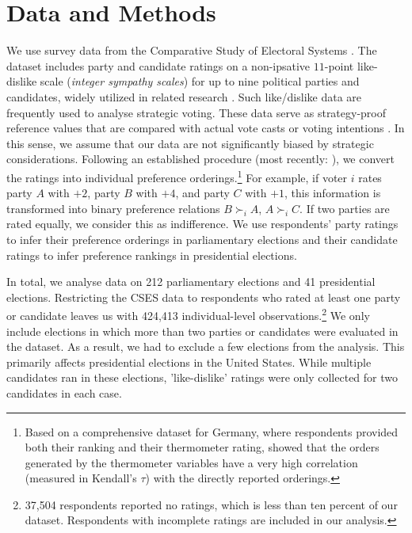 \documentclass[12pt]{scrartcl}
\newcommand{\nbparliament}{212 }
\newcommand{\nbpresidential}{41 }
\begin{document}
\section{Data and Methods}\label{sec.datamethods}  
We use survey data from the Comparative Study of Electoral Systems \citep{CSES2020}. The dataset includes party and candidate ratings on a non-ipsative $11$-point like-dislike scale (\emph{integer sympathy scales}) for up to nine political parties and candidates, widely utilized in related research \citep[e.g.,][]{Kalandrakis2022, Desai2025}. Such like/dislike data are frequently used to analyse strategic voting. These data serve as strategy-proof reference values that are compared with actual vote casts or voting intentions \citep{Abramson2009, Eggers2024, Nunez2024}. In this sense, we assume that our data are not significantly biased by strategic considerations. Following an established procedure (most recently: \cite{Lachat2024}), we convert the ratings into individual preference orderings.\footnote{
    Based on a comprehensive dataset for Germany, where respondents provided both their ranking and their thermometer rating, \cite{Barbaro2022} showed that the orders generated by the thermometer variables have a very high correlation (measured in Kendall's $\tau$) with the directly reported orderings.
} For example, if voter $i$ rates party $A$ with $+2$, party $B$ with $+4$, and party $C$ with $+1$, this information is transformed into binary preference relations $B \succ_i A$, $A \succ_i C$. If two parties are rated equally, we consider this as indifference. We use respondents' party ratings to infer their preference orderings in parliamentary elections and their candidate ratings to infer preference rankings in presidential elections.

In total, we analyse data on \nbparliament parliamentary elections and \nbpresidential presidential elections. Restricting the CSES data to respondents who rated at least one party or candidate leaves us with 424,413 individual-level observations.\footnote{
    37,504 respondents reported no ratings, which is less than ten percent of our dataset. Respondents with incomplete ratings are included in our analysis.
} We only include elections in which more than two 
parties or candidates were evaluated in the dataset. As a result, we had to exclude a few elections from the analysis. This primarily affects presidential elections in the United States. While multiple candidates ran in these elections, 'like-dislike' ratings were only collected for two candidates in each case.
\end{document}
